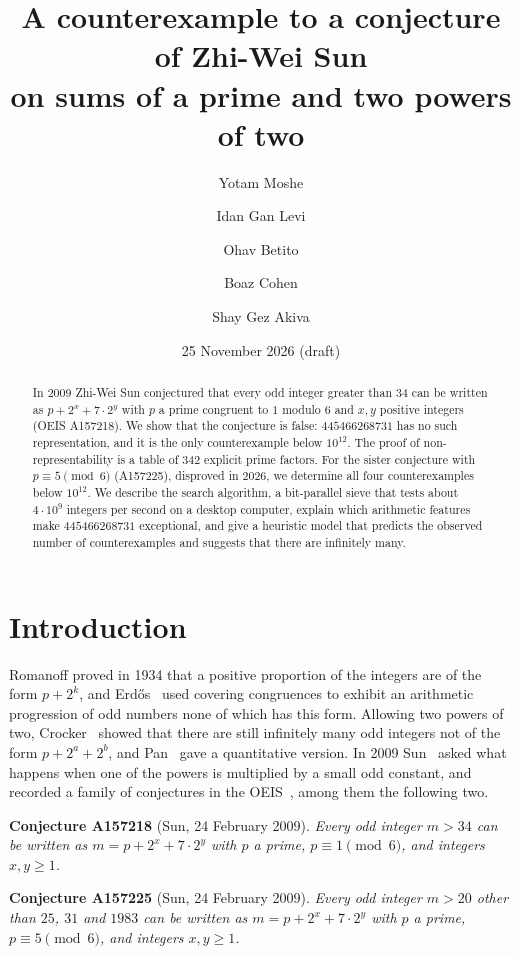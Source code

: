 \documentclass[11pt]{article}
\title{A counterexample to a conjecture of Zhi-Wei Sun\\ on sums of a prime and two powers of two}
\author{Yotam Moshe \and Idan Gan Levi \and Ohav Betito \and Boaz Cohen \and Shay Gez Akiva}
\date{25 November 2026 \quad (draft)}
\theoremstyle{definition}
\theoremstyle{remark}
\begin{document}
\maketitle

\begin{abstract}
In 2009 Zhi-Wei Sun conjectured that every odd integer greater than $34$ can be written as
$p+2^x+7\cdot 2^y$ with $p$ a prime congruent to $1$ modulo $6$ and $x,y$ positive integers
(OEIS A157218). We show that the conjecture is false: $445466268731$ has no such representation,
and it is the only counterexample below $10^{12}$. The proof of non-representability is a table
of $342$ explicit prime factors. For the sister conjecture with $p\equiv 5 \pmod 6$ (A157225),
disproved in 2026, we determine all four counterexamples below $10^{12}$. We describe the search
algorithm, a bit-parallel sieve that tests about $4\cdot 10^{9}$ integers per second on a desktop
computer, explain which arithmetic features make $445466268731$ exceptional, and give a heuristic
model that predicts the observed number of counterexamples and suggests that there are infinitely many.
\end{abstract}

\section{Introduction}

Romanoff proved in 1934 that a positive proportion of the integers are of the form $p+2^k$, and
Erd\H{o}s~\cite{erdos} used covering congruences to exhibit an arithmetic progression of odd numbers
none of which has this form. Allowing two powers of two, Crocker~\cite{crocker} showed that there are
still infinitely many odd integers not of the form $p+2^a+2^b$, and Pan~\cite{pan} gave a
quantitative version. In 2009 Sun~\cite{sun} asked what happens when one of the powers is
multiplied by a small odd constant, and recorded a family of conjectures in the OEIS~\cite{oeis},
among them the following two.

\medskip
\noindent\textbf{Conjecture A157218} (Sun, 24 February 2009). \emph{Every odd integer $m>34$ can be
written as $m=p+2^x+7\cdot 2^y$ with $p$ a prime, $p\equiv 1 \pmod 6$, and integers $x,y\ge 1$.}

\medskip
\noindent\textbf{Conjecture A157225} (Sun, 24 February 2009). \emph{Every odd integer $m>20$ other
than $25$, $31$ and $1983$ can be written as $m=p+2^x+7\cdot 2^y$ with $p$ a prime,
$p\equiv 5 \pmod 6$, and integers $x,y\ge 1$.}
\end{document}
